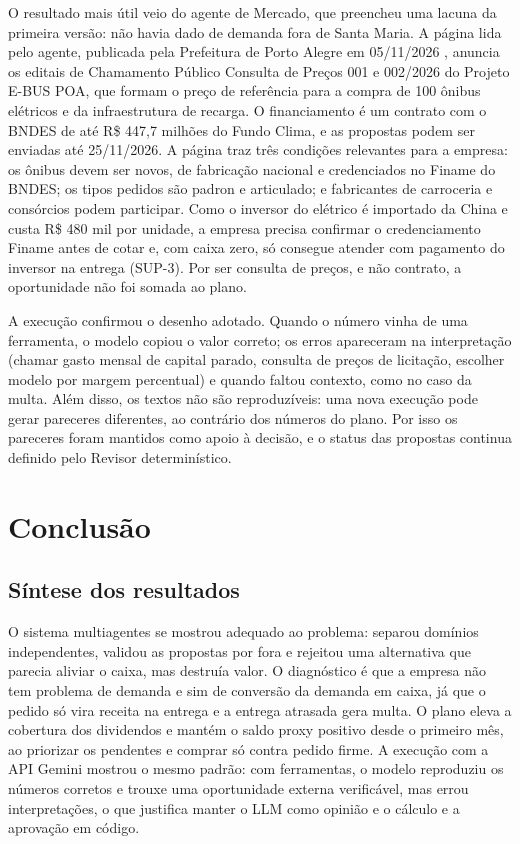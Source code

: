 \documentclass[12pt,a4paper,oneside,brazil]{abntex2}
\begin{document}
O resultado mais útil veio do agente de Mercado, que preencheu uma lacuna da primeira versão: não havia dado de demanda fora de Santa Maria. A página lida pelo agente, publicada pela Prefeitura de Porto Alegre em 05/11/2026 \cite{poa2026ebus}, anuncia os editais de Chamamento Público Consulta de Preços 001 e 002/2026 do Projeto E-BUS POA, que formam o preço de referência para a compra de 100 ônibus elétricos e da infraestrutura de recarga. O financiamento é um contrato com o BNDES de até R\$ 447,7 milhões do Fundo Clima, e as propostas podem ser enviadas até 25/11/2026. A página traz três condições relevantes para a empresa: os ônibus devem ser novos, de fabricação nacional e credenciados no Finame do BNDES; os tipos pedidos são padron e articulado; e fabricantes de carroceria e consórcios podem participar. Como o inversor do elétrico é importado da China e custa R\$ 480 mil por unidade, a empresa precisa confirmar o credenciamento Finame antes de cotar e, com caixa zero, só consegue atender com pagamento do inversor na entrega (SUP-3). Por ser consulta de preços, e não contrato, a oportunidade não foi somada ao plano.

A execução confirmou o desenho adotado. Quando o número vinha de uma ferramenta, o modelo copiou o valor correto; os erros apareceram na interpretação (chamar gasto mensal de capital parado, consulta de preços de licitação, escolher modelo por margem percentual) e quando faltou contexto, como no caso da multa. Além disso, os textos não são reproduzíveis: uma nova execução pode gerar pareceres diferentes, ao contrário dos números do plano. Por isso os pareceres foram mantidos como apoio à decisão, e o status das propostas continua definido pelo Revisor determinístico.

\chapter{Conclusão}
\section{Síntese dos resultados}

O sistema multiagentes se mostrou adequado ao problema: separou domínios independentes, validou as propostas por fora e rejeitou uma alternativa que parecia aliviar o caixa, mas destruía valor. O diagnóstico é que a empresa não tem problema de demanda e sim de conversão da demanda em caixa, já que o pedido só vira receita na entrega e a entrega atrasada gera multa. O plano eleva a cobertura dos dividendos e mantém o saldo proxy positivo desde o primeiro mês, ao priorizar os pendentes e comprar só contra pedido firme. A execução com a API Gemini mostrou o mesmo padrão: com ferramentas, o modelo reproduziu os números corretos e trouxe uma oportunidade externa verificável, mas errou interpretações, o que justifica manter o LLM como opinião e o cálculo e a aprovação em código.
\end{document}
